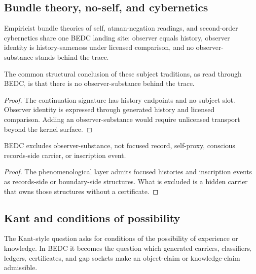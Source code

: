 \subsection{Bundle theory, no-self, and cybernetics}
\label{subsec:philosophy-bundle-no-self-cybernetics}

\begin{definition}
\label{def:philosophy-triple-subject-genealogy}
Empiricist bundle theories of self, atman-negation readings, and
second-order cybernetics share one BEDC landing site: observer equals
history, observer identity is history-sameness under licensed
comparison, and no observer-substance stands behind the trace.
\end{definition}

\begin{theorem}
\label{thm:philosophy-shared-subject-no-hidden-observer}
The common structural conclusion of these subject traditions, as read
through BEDC, is that there is no observer-substance behind the trace.
\end{theorem}
\begin{proof}
The continuation signature has history endpoints and no subject slot.
Observer identity is expressed through generated history and licensed
comparison. Adding an observer-substance would require unlicensed
transport beyond the kernel surface.
\end{proof}

\begin{corollary}
\label{cor:philosophy-no-subject-not-anti-experience}
BEDC excludes observer-substance, not focused record, self-proxy,
conscious records-side carrier, or inscription event.
\end{corollary}
\begin{proof}
The phenomenological layer admits focused histories and inscription
events as records-side or boundary-side structures. What is excluded is
a hidden carrier that owns those structures without a certificate.
\end{proof}

\subsection{Kant and conditions of possibility}
\label{subsec:philosophy-kant-conditions}

\begin{definition}
\label{def:philosophy-kantian-question}
The Kant-style question asks for conditions of the possibility of
experience or knowledge. In BEDC it becomes the question which
generated carriers, classifiers, ledgers, certificates, and gap
sockets make an object-claim or knowledge-claim admissible.
\end{definition}

